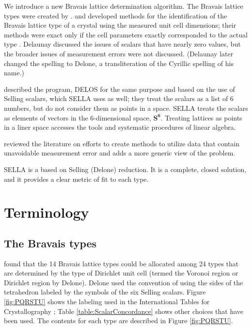 \documentclass[preprint]{iucr}              %
\newcommand{\SVI}[0]{$\mathbf{S^{6}}$}
\begin{document}
	We introduce a new Bravais lattice determination algorithm. The Bravais 
	lattice types were created by .  
	and  developed methods for the identification 
	of the Bravais lattice type of a crystal using the measured unit cell 
	dimensions; their methods were exact only if the cell parameters 
	exactly corresponded to the actual type \cite{Patterson1957}. 
	Delaunay \cite{Delaunay1932} discussed the issues of scalars that have nearly zero values, 
	but the broader issues of measurement errors were not 
	discussed. (Delaunay later changed the spelling to Delone, a
	transliteration of the Cyrillic spelling of his name.)
	
	 described the program, DELOS
	for the same purpose and based on the use of Selling scalars, which
	SELLA uses as well; they treat the scalars as a list of 6 numbers, but do not consider them as points in 
	a space.  SELLA treats the scalars as elements of vectors in the 6-dimensional
	space, \SVI. Treating lattices as points in a liner space accesses the tools
	and systematic procedures of linear algebra.
	
	
	 reviewed the literature on 
	 efforts to create methods to utilize data that contain unavoidable 
	measurement error and adds a more generic view of the problem.
	
	SELLA is a based on Selling (Delone) reduction. It is a complete, closed solution, and it provides a clear metric of fit to each type.
	
	\section{Terminology}
	
	\subsection{The Bravais types}
	
	 found that the 14 Bravais lattice types 
	could be allocated among 24 types that are determined by the 
	type of Dirichlet unit cell (termed the Voronoi region \cite{Voronoi1908} or 
	Dirichlet region \cite{dirichlet1850} by 
	Delone). Delone used the convention of 
	using the sides of the tetrahedron labeled by the symbols of the six
	Selling scalars. Figure \ref{fig:PQRSTU} shows the labeling used in
	the International Tables for Crystallography \cite{Henry1952}; 
	Table \ref{table:ScalarConcordance} shows other choices that have been used. The
	contents for each type are described in Figure \ref{fig:PQRSTU}.
	
\end{document}
